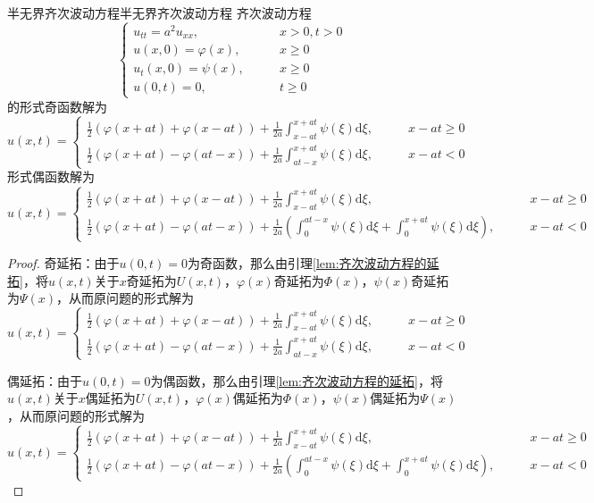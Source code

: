 \documentclass[lang = cn, scheme = chinese, thmcnt = section]{elegantbook}
\newcommand{\dd}{\mathrm{d}}           %
\newcommand{\dis}{\displaystyle}
\begin{document}
\begin{theorem}{半无界齐次波动方程}{半无界齐次波动方程}
	齐次波动方程
	$$
	\begin{cases}
		u_{tt}=a^2u_{xx},\qquad & x>0,t>0\\
		u(x,0)=\varphi(x),\qquad & x\ge 0\\
		u_t(x,0)=\psi(x),\qquad & x\ge 0\\
		u(0,t)=0,\qquad & t\ge 0
	\end{cases}
	$$
	的形式奇函数解为
	$$
	u(x,t)=\begin{cases}
		\dis
		\frac{1}{2}(\varphi(x+at)+\varphi(x-at))+\frac{1}{2a}\int_{x-at}^{x+at}\psi(\xi)\dd\xi
		,\qquad & x-at\ge 0\\
		\dis
		\frac{1}{2}(\varphi(x+at)-\varphi(at-x))+\frac{1}{2a}\int_{at-x}^{x+at}\psi(\xi)\dd\xi
		,\qquad & x-at< 0
	\end{cases}
	$$
	形式偶函数解为
	$$
	u(x,t)=\begin{cases}
		\dis
		\frac{1}{2}(\varphi(x+at)+\varphi(x-at))+\frac{1}{2a}\int_{x-at}^{x+at}\psi(\xi)\dd\xi
		,\qquad & x-at\ge 0\\
		\dis
		\frac{1}{2}(\varphi(x+at)-\varphi(at-x))+\frac{1}{2a}\left(\int_{0}^{at-x}\psi(\xi)\dd\xi+\int_{0}^{x+at}\psi(\xi)\dd\xi\right)
		,\qquad & x-at< 0
	\end{cases}
	$$
\end{theorem}

\begin{proof}
	奇延拓：由于$u(0,t)=0$为奇函数，那么由引理\ref{lem:齐次波动方程的延拓}，将$u(x,t)$关于$x$奇延拓为$U(x,t)$，$\varphi(x)$奇延拓为$\Phi(x)$，$\psi(x)$奇延拓为$\Psi(x)$，从而原问题的形式解为
	$$
	u(x,t)=\begin{cases}
		\dis
		\frac{1}{2}(\varphi(x+at)+\varphi(x-at))+\frac{1}{2a}\int_{x-at}^{x+at}\psi(\xi)\dd\xi
		,\qquad&  x-at\ge 0\\
		\dis
		\frac{1}{2}(\varphi(x+at)-\varphi(at-x))+\frac{1}{2a}\int_{at-x}^{x+at}\psi(\xi)\dd\xi
		,\qquad & x-at< 0
	\end{cases}
	$$
	
	偶延拓：由于$u(0,t)=0$为偶函数，那么由引理\ref{lem:齐次波动方程的延拓}，将$u(x,t)$关于$x$偶延拓为$U(x,t)$，$\varphi(x)$偶延拓为$\Phi(x)$，$\psi(x)$偶延拓为$\Psi(x)$，从而原问题的形式解为
	$$
	u(x,t)=\begin{cases}
		\dis
		\frac{1}{2}(\varphi(x+at)+\varphi(x-at))+\frac{1}{2a}\int_{x-at}^{x+at}\psi(\xi)\dd\xi
		,\qquad  & x-at\ge 0\\
		\dis
		\frac{1}{2}(\varphi(x+at)-\varphi(at-x))+\frac{1}{2a}\left(\int_{0}^{at-x}\psi(\xi)\dd\xi+\int_{0}^{x+at}\psi(\xi)\dd\xi\right)
		,\qquad& x-at< 0
	\end{cases}
	$$
\end{proof}
\end{document}
